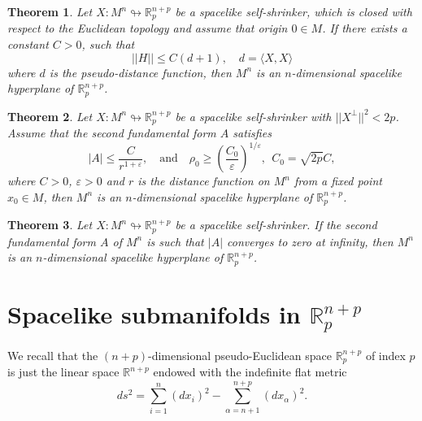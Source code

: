 \documentclass[leqno,11pt]{amsart}
\theoremstyle{plain}
\newtheorem{theorem}{\indent\sc Theorem}[section]
\theoremstyle{definition}
\numberwithin{equation}{section}
\begin{document}
\begin{theorem}\label{thm1}
Let $X:M^n\looparrowright\mathbb R^{n+p}_{p}$ be a spacelike self-shrinker, which is closed with respect to the Euclidean topology and assume that origin $0 \in M$. If there exists a constant $C>0$, such that 
$$||H||\leq C(d+1), \quad  d = \langle X, X \rangle$$ 
where $d$ is the pseudo-distance function, then $M^n$ is an $n$-dimensional spacelike hyperplane of $\mathbb R^{n+p}_{p}$.
\end{theorem}

\begin{theorem}\label{thm3}
	Let $X:M^n\looparrowright\mathbb R^{n+p}_{p}$ be a spacelike self-shrinker with  $||X^\perp||^2 < 2p$. Assume that the second fundamental form $A$ satisfies
	$$
	|A| \leq \dfrac{C}{r^{1+\varepsilon}}, \quad \text{and} \quad \rho_0 \geq \left( \dfrac{C_0}{\varepsilon} \right)^{1/\varepsilon},  ~~ C_0 = \sqrt{2p}C,
	$$
	where $C>0$, $\varepsilon > 0$ and  $ r $ is the distance function on $ M^n $ from a fixed point $ x_0 \in M $, then $M^n$ is an $n$-dimensional spacelike hyperplane of $\mathbb R^{n+p}_{p}$.
\end{theorem}

\begin{theorem}\label{thm2}
Let $X:M^n\looparrowright\mathbb R^{n+p}_p$ be a spacelike self-shrinker. If the second fundamental form $A$ of $M^n$ is such that $|A|$ converges to zero at infinity, then $M^n$ is an $n$-dimensional spacelike hyperplane of $\mathbb R^{n+p}_p$.
\end{theorem}


\section{Spacelike submanifolds in $\mathbb{R}^{n+p}_ p$ }\label{sec:preliminaries}



We recall that the $(n+p)$-dimensional pseudo-Euclidean space $\mathbb{R}^{n+p}_{p}$ of index $p$ is just the linear space $\mathbb{R}^{n+p}$ endowed with the indefinite flat metric
$$ds^2=\sum_{i=1}^{n}(dx_{i})^{2}-\sum_{\alpha=n+1}^{n+p}(dx_{\alpha})^2.$$
\end{document}
